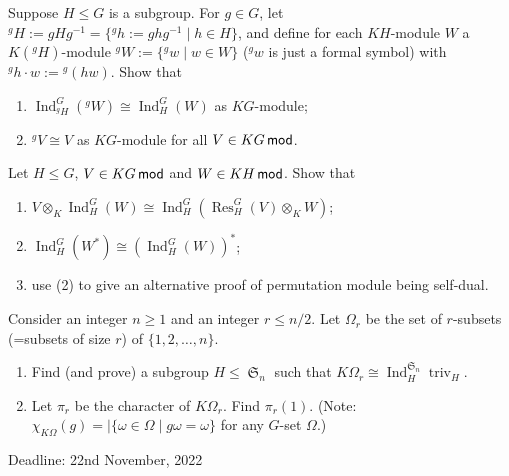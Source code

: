 \documentclass[12pt]{article}
\newcommand{\triv}{\operatorname{triv}\nolimits}
\DeclareMathOperator{\Sn}{\mathfrak{S}}
\newcommand{\Res}{\operatorname{Res}\nolimits}
\newcommand{\Ind}{\operatorname{Ind}\nolimits}
\begin{document}
\begin{question}
Suppose $H\leq G$ is a subgroup.
For $g\in G$, let ${}^gH:=gHg^{-1}=\{{}^gh:=ghg^{-1}\mid h\in H\}$, and define for each $KH$-module $W$ a $K({}^gH)$-module ${}^gW:=\{{}^gw\mid w\in W\}$ (${}^gw$ is just a formal symbol) with ${}^gh\cdot w:= {}^g(hw)$.
Show that 
\begin{enumerate}
\item $\Ind_{{}^gH}^G ({}^g W) \cong \Ind_H^G(W)$ as $KG$-module;
\item ${}^gV \cong V$ as $KG$-module for all $V\in KG\mod$.
\end{enumerate}
\end{question}

\begin{question}
Let $H\leq G$, $V\in KG\mod$ and $W\in KH\mod$.  Show that
\begin{enumerate}
\item $V\otimes_K \Ind_H^G(W) \cong \Ind_H^G(\Res_H^G(V)\otimes_KW)$;
\item $\Ind_H^G (W^*) \cong (\Ind_H^G(W))^*$;
\item use (2) to give an alternative proof of permutation module being self-dual.
\end{enumerate}
\end{question}

\begin{question}
Consider an integer $n\geq 1$ and an integer $r\leq n/2$.  Let $\Omega_r$ be the set of $r$-subsets (=subsets of size $r$) of $\{1,2,\ldots, n\}$.
\begin{enumerate}
\item Find (and prove) a subgroup $H\leq \Sn_n$ such that $K\Omega_r \cong \Ind_H^{\Sn_n}\triv_H$.

\item Let $\pi_r$ be the character of $K\Omega_r$.  Find $\pi_r(1)$.  (Note: $\chi_{K\Omega}(g)=|\{\omega\in \Omega\mid g\omega =\omega\}$ for any $G$-set $\Omega$.)
\end{enumerate}
\end{question}



\vfill
\hfill Deadline: 22nd November, 2022
\end{document}
